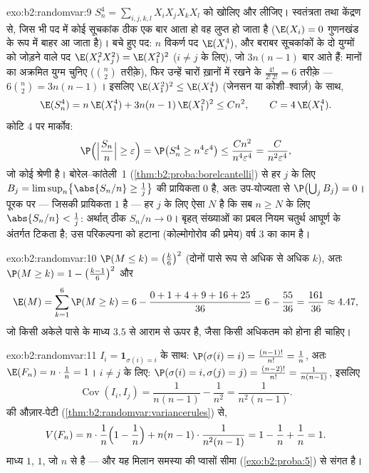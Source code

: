 \begin{solution}{exo:b2:randomvar:9}
$S_n^4 = \sum_{i,j,k,l}X_iX_jX_kX_l$ को खोलिए और  लीजिए। स्वतंत्रता तथा केंद्रण से, जिस भी
पद में कोई सूचकांक ठीक एक बार आता हो वह लुप्त हो जाता है ($\E(X_i) = 0$
गुणनखंड के रूप में बाहर आ जाता है)। बचे हुए पद: $n$ विकर्ण पद $\E(X_i^4)$,
और बराबर सूचकांकों के दो युग्मों को जोड़ने वाले पद $\E(X_i^2X_j^2) =
\E(X_1^2)^2$ ($i \neq j$ के
लिए), जो $3n(n-1)$ बार आते हैं: मानों का अक्रमित युग्म चुनिए ($\binom n2$
तरीक़े), फिर उन्हें चारों ख़ानों में रखने के $\frac{4!}{2!\,2!} = 6$ तरीक़े --- $6\binom n2 = 3n(n-1)$।
इसलिए $\E(X_1^2)^2
\leq \E(X_1^4)$ (जेनसन या कोशी--श्वार्ज़) के साथ,
\[
\E(S_n^4) = n\,\E(X_1^4) + 3n(n-1)\,\E(X_1^2)^2
\leq C n^2,
\qquad C = 4\,\E(X_1^4) .
\]
कोटि 4 पर मार्कोव:
\[
\P\Bigl(\Bigl|\frac{S_n}{n}\Bigr| \geq \varepsilon\Bigr)
= \P\bigl(S_n^4 \geq n^4\varepsilon^4\bigr)
\leq \frac{Cn^2}{n^4\varepsilon^4}
= \frac{C}{n^2\varepsilon^4} ,
\]
जो कोई  श्रेणी है। बोरेल--कांतेली~1 (\cref{thm:b2:proba:borelcantelli}) से हर $j$ के लिए
 $B_j = \limsup_n\bigl\{\abs{S_n/n} \geq \frac1j\bigr\}$ की प्रायिकता $0$ है, अतः  उप-योज्यता से $\P\bigl(\bigcup_j B_j\bigr) = 0$।
पूरक पर --- जिसकी प्रायिकता $1$ है --- हर $j$ के लिए ऐसा $N$ है
कि सब $n \geq N$ के लिए $\abs{S_n/n} < \frac1j$: अर्थात् ठीक $S_n/n \to 0$। बृहत् संख्याओं का प्रबल
नियम चतुर्थ आघूर्ण के अंतर्गत टिकता है; उस परिकल्पना को हटाना
(कोल्मोगोरोव की प्रमेय) वर्ष 3 का काम है।
\end{solution}

\begin{solution}{exo:b2:randomvar:10}
$\P(M \leq k) = \bigl(\frac k6\bigr)^2$ (दोनों पासे  रूप से अधिक से अधिक $k$), अतः $\P(M \geq k) = 1 -
\bigl(\frac{k-1}6\bigr)^2$ और
\[
\E(M) = \sum_{k=1}^6\P(M \geq k)
= 6 - \frac{0 + 1 + 4 + 9 + 16 + 25}{36}
= 6 - \frac{55}{36} = \frac{161}{36} \approx 4.47 ,
\]
जो किसी अकेले पासे के माध्य $3.5$ से आराम से ऊपर है, जैसा किसी
अधिकतम को होना ही चाहिए।
\end{solution}

\begin{solution}{exo:b2:randomvar:11}
$I_i = \mathbf 1_{\sigma(i) = i}$ के साथ: $\P(\sigma(i) = i) =
\frac{(n-1)!}{n!} = \frac1n$, अतः $\E(F_n) = n\cdot\frac1n =
1$। $i \neq j$ के लिए: $\P(\sigma(i) = i, \sigma(j) = j) =
\frac{(n-2)!}{n!} = \frac1{n(n-1)}$, इसलिए
\[
\operatorname{Cov}(I_i, I_j) = \frac1{n(n-1)} - \frac1{n^2}
= \frac{1}{n^2(n-1)} .
\]
 की औज़ार-पेटी (\cref{thm:b2:randomvar:variancerules}) से,
\[
V(F_n) = n\cdot\frac1n\Bigl(1 - \frac1n\Bigr)
+ n(n-1)\cdot\frac1{n^2(n-1)}
= 1 - \frac1n + \frac1n = 1 .
\]
माध्य $1$,  $1$, जो $n$ से  है --- और यह मिलान
समस्या की प्वासों सीमा (\cref{exo:b2:proba:5}) से संगत है।
\end{solution}

